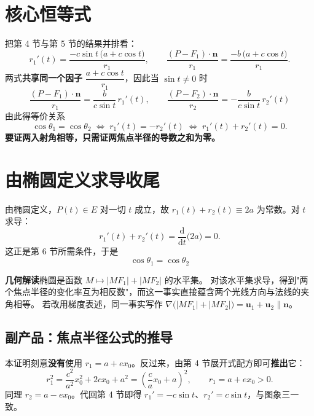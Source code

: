 \documentclass[11pt]{ctexart}
\newcommand{\uu}{\mathbf{u}}
\begin{document}
\section{核心恒等式}

把第 4 节与第 5 节的结果并排看：
\[
r_{1}'(t)=\frac{-c\sin t\,\bigl(a+c\cos t\bigr)}{r_{1}},
\qquad
\frac{(P-F_{1})\cdot\mathbf{n}}{r_{1}}=\frac{-b\,\bigl(a+c\cos t\bigr)}{r_{1}} .
\]
两式\textbf{共享同一个因子} $\dfrac{a+c\cos t}{r_{1}}$，因此当 $\sin t\neq 0$ 时
\[
\boxed{\;
\frac{(P-F_{1})\cdot\mathbf{n}}{r_{1}}=\frac{b}{c\sin t}\,r_{1}'(t),
\qquad
\frac{(P-F_{2})\cdot\mathbf{n}}{r_{2}}=-\frac{b}{c\sin t}\,r_{2}'(t)
\;}
\]
由此得等价关系
\[
\cos\theta_{1}=\cos\theta_{2}
\;\Longleftrightarrow\;
r_{1}'(t)=-r_{2}'(t)
\;\Longleftrightarrow\;
r_{1}'(t)+r_{2}'(t)=0 .
\]
\textbf{要证两入射角相等，只需证两焦点半径的导数之和为零。}

\section{由椭圆定义求导收尾}

由椭圆定义，$P(t)\in E$ 对一切 $t$ 成立，故 $r_{1}(t)+r_{2}(t)\equiv 2a$ 为常数。对 $t$ 求导：
\[
r_{1}'(t)+r_{2}'(t)=\frac{\mathrm{d}}{\mathrm{d}t}\bigl(2a\bigr)=0 .
\]
这正是第 6 节所需条件，于是
\[
\boxed{\cos\theta_{1}=\cos\theta_{2}}
\]

\begin{keybox}
\textbf{几何解读}\quad 椭圆是函数 $M\mapsto|MF_{1}|+|MF_{2}|$ 的水平集。
对该水平集求导，得到"两个焦点半径的变化率互为相反数"，而这一事实直接蕴含两个光线方向与法线的夹角相等。
若改用梯度表述，同一事实写作 $\nabla\bigl(|MF_{1}|+|MF_{2}|\bigr)=\uu_{1}+\uu_{2}\parallel\mathbf{n}$。
\end{keybox}

\subsection{副产品：焦点半径公式的推导}\label{sec:rformula}

本证明刻意\textbf{没有}使用 $r_{1}=a+ex_{0}$。反过来，由第 4 节展开式配方即可\textbf{推出}它：
\[
r_{1}^{2}=\frac{c^{2}}{a^{2}}x_{0}^{2}+2cx_{0}+a^{2}
=\left(\frac{c}{a}x_{0}+a\right)^{2},
\qquad r_{1}=a+ex_{0}>0 .
\]
同理 $r_{2}=a-ex_{0}$。代回第 4 节即得 $r_{1}'=-c\sin t$、$r_{2}'=c\sin t$，与图象三一致。

\end{document}
